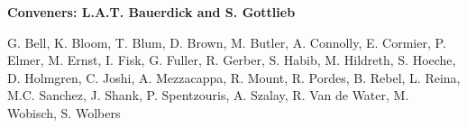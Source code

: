 

\begin{center}

\begin{large} {\bf Conveners: L.A.T. Bauerdick and S. Gottlieb}\end{large}

G. Bell,
K. Bloom,
T. Blum,
D. Brown,
M. Butler,
A. Connolly,
E. Cormier,
P. Elmer,
M. Ernst,
I. Fisk,
G. Fuller,
R. Gerber,
S. Habib,
M. Hildreth,
S. Hoeche,
D. Holmgren,
C. Joshi,
A. Mezzacappa,
R. Mount,
R. Pordes,
B. Rebel,
L. Reina,
M.C. Sanchez,
J. Shank,
P. Spentzouris,
A. Szalay,
R. Van de Water,
M. Wobisch,
S. Wolbers


\end{center}

